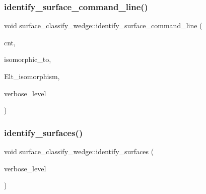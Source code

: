 \mbox{\label{classsurface__classify__wedge_a2b1d47a0781bd73da10d97c397d61da1}} 
\subsubsection{\texorpdfstring{identify\+\_\+surface\+\_\+command\+\_\+line()}{identify\_surface\_command\_line()}}
{\footnotesize\ttfamily void surface\+\_\+classify\+\_\+wedge\+::identify\+\_\+surface\+\_\+command\+\_\+line (\begin{DoxyParamCaption}\item[{\mbox{\hyperlink{galois_8h_a09fddde158a3a20bd2dcadb609de11dc}{I\+NT}}}]{cnt,  }\item[{\mbox{\hyperlink{galois_8h_a09fddde158a3a20bd2dcadb609de11dc}{I\+NT}} \&}]{isomorphic\+\_\+to,  }\item[{\mbox{\hyperlink{galois_8h_a09fddde158a3a20bd2dcadb609de11dc}{I\+NT}} $\ast$}]{Elt\+\_\+isomorphism,  }\item[{\mbox{\hyperlink{galois_8h_a09fddde158a3a20bd2dcadb609de11dc}{I\+NT}}}]{verbose\+\_\+level }\end{DoxyParamCaption})}

\mbox{\label{classsurface__classify__wedge_a4ce744fe35a045372035b0b998f852e5}} 
\subsubsection{\texorpdfstring{identify\+\_\+surfaces()}{identify\_surfaces()}}
{\footnotesize\ttfamily void surface\+\_\+classify\+\_\+wedge\+::identify\+\_\+surfaces (\begin{DoxyParamCaption}\item[{\mbox{\hyperlink{galois_8h_a09fddde158a3a20bd2dcadb609de11dc}{I\+NT}}}]{verbose\+\_\+level }\end{DoxyParamCaption})}

